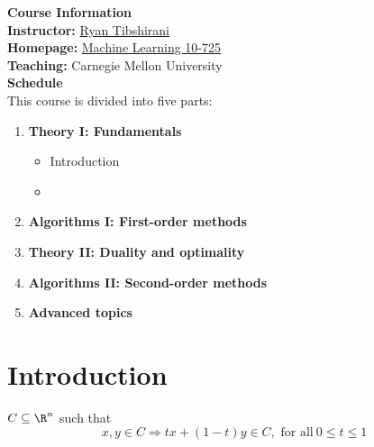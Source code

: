 \documentclass[a4paper]{article}
\def\nlecturer {Ryan Tibshirani}
\begin{document}
\maketitle
{\small
\noindent\textbf{Course Information}\\ 
\indent \textbf{Instructor:} \textcolor{blue}{\href{https://www.stat.berkeley.edu/~ryantibs/index.html}{\nlecturer}} \\
\indent\textbf{Homepage:} \textcolor{blue}{\href{https://www.stat.cmu.edu/~ryantibs/convexopt/}{Machine Learning 10-725}} \\
\indent\textbf{Teaching:} Carnegie Mellon University \\

\vspace{10pt}
\noindent\textbf{Schedule}\\
\indent This course is divided into five parts: 
\begin{enumerate}
    \item \textbf{Theory I: Fundamentals}
    \begin{itemize}
        \item Introduction
        \item 
    \end{itemize}
    \item \textbf{Algorithms I: First-order methods}
    \item \textbf{Theory II: Duality and optimality}
    \item \textbf{Algorithms II: Second-order methods}
    \item \textbf{Advanced topics}
\end{enumerate}

\tableofcontents

\setcounter{section}{-1}
\section{Introduction}
\begin{defi}
    $C \subseteq \R^n$ such that 
    \[
        x, y \in C \Longrightarrow  tx + (1-t)y \in C,\text{\ for\ all}\ 0 \leq t \leq 1 
    \]
\end{defi}


}
\end{document}
